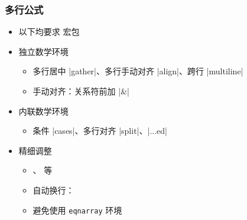\begin{frame}[fragile]
\frametitle{多行公式}
\begin{itemize}
  \item 以下均要求  宏包
  \item 独立数学环境

  \begin{itemize}
    \item 多行居中 |gather|、多行手动对齐 |align|、跨行 |multiline|
    \item 手动对齐：关系符前加 |&|
  \end{itemize}

  \item 内联数学环境

  \begin{itemize}
    \item 条件 |cases|、多行对齐 |split|、|...ed|
  \end{itemize} \pause

  \item 精细调整

  \begin{itemize}
    \item {}、 等
    \item 自动换行：
    \item \alert{避免使用 \texttt{eqnarray} 环境}
  \end{itemize}
\end{itemize}
\end{frame}

